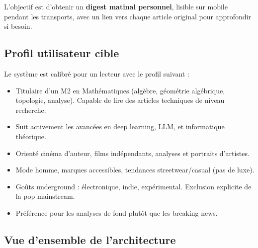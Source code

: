 \documentclass[11pt, a4paper]{article}
\begin{document}
L'objectif est d'obtenir un \textbf{digest matinal personnel}, lisible sur mobile pendant les transports, avec un lien vers chaque article original pour approfondir si besoin.

\subsection{Profil utilisateur cible}

Le système est calibré pour un lecteur avec le profil suivant :
\begin{itemize}[leftmargin=2cm]
    \item[\textbf{Maths}] Titulaire d'un M2 en Mathématiques (algèbre, géométrie algébrique, topologie, analyse). Capable de lire des articles techniques de niveau recherche.
    \item[\textbf{Tech/IA}] Suit activement les avancées en deep learning, LLM, et informatique théorique.
    \item[\textbf{Cinéma}] Orienté cinéma d'auteur, films indépendants, analyses et portraits d'artistes.
    \item[\textbf{Mode}] Mode homme, marques accessibles, tendances streetwear/casual (pas de luxe).
    \item[\textbf{Musique}] Goûts underground : électronique, indie, expérimental. Exclusion explicite de la pop mainstream.
    \item[\textbf{Actualité}] Préférence pour les analyses de fond plutôt que les breaking news.
\end{itemize}

\subsection{Vue d'ensemble de l'architecture}
\end{document}
